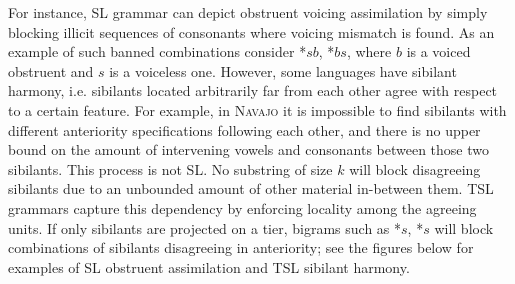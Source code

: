 \documentclass[a4paper,12pt]{article}
\begin{document}
For instance, SL grammar can depict obstruent voicing assimilation by simply blocking illicit sequences of consonants where voicing mismatch is found.
As an example of such banned combinations consider *$s$$b$, *$b$$s$, where $b$ is a voiced obstruent and $s$ is a voiceless one.
However, some languages have sibilant harmony, i.e. sibilants located arbitrarily far from each other agree with respect to a certain feature.
For example, in \textsc{Navajo} it is impossible to find sibilants with different anteriority specifications following each other, and there is no upper bound on the amount of intervening vowels and consonants between those two sibilants.
This process is not SL.
No substring of size $k$ will block disagreeing sibilants due to an unbounded amount of other material in-between them.
TSL grammars capture this dependency by enforcing locality among the agreeing units.
If only sibilants are projected on a tier, bigrams such as *$s$\emph{\textesh}, *\emph{\textesh}\hspace{-0.07em}$s$ will block combinations of sibilants disagreeing in anteriority; see the figures below for examples of SL obstruent assimilation and TSL sibilant harmony.
\end{document}
